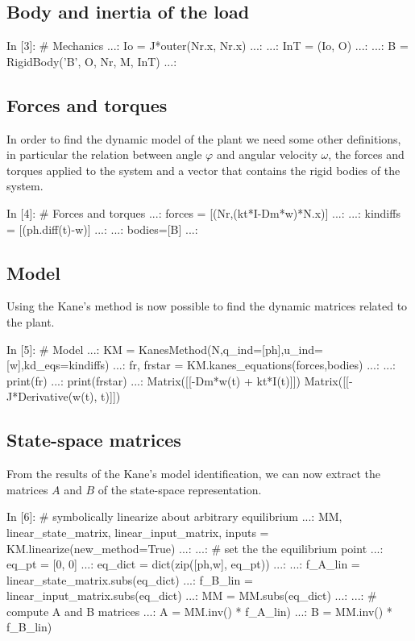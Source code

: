 \subsection{Body and inertia of the load}
\begin{code}
In [3]: # Mechanics
   ...: Io = J*outer(Nr.x, Nr.x)
   ...: 
   ...: InT = (Io, O)
   ...: 
   ...: B = RigidBody('B', O, Nr, M, InT)
   ...: 
\end{code}

\subsection{Forces and torques}
In order to find the dynamic model of the plant we need some other definitions, 
in particular the relation between angle $\varphi$ and angular velocity 
$\omega$, the forces and torques applied to the system and a vector that 
contains the rigid bodies of the system.

\begin{code}
In [4]: # Forces and torques
   ...: forces = [(Nr,(kt*I-Dm*w)*N.x)]
   ...: 
   ...: kindiffs = [(ph.diff(t)-w)]
   ...: 
   ...: bodies=[B]
   ...: 
\end{code}

\subsection{Model}

Using the Kane's method is now possible to find the dynamic matrices related to 
the plant.

\begin{code}
In [5]: # Model
   ...: KM = KanesMethod(N,q_ind=[ph],u_ind=[w],kd_eqs=kindiffs)
   ...: fr, frstar = KM.kanes_equations(forces,bodies)
   ...: 
   ...: print(fr)
   ...: print(frstar)
   ...: 
Matrix([[-Dm*w(t) + kt*I(t)]])
Matrix([[-J*Derivative(w(t), t)]])
\end{code}

\subsection{State-space matrices}
From the results of the Kane's model identification, we can now extract the 
matrices $A$ and $B$ of the state-space representation.

\begin{code}
In [6]: # symbolically linearize about arbitrary equilibrium
   ...: MM, linear_state_matrix, linear_input_matrix, inputs = 
KM.linearize(new_method=True)
   ...: 
   ...: # set the the equilibrium point
   ...: eq_pt = [0, 0]
   ...: eq_dict = dict(zip([ph,w], eq_pt))
   ...: 
   ...: f_A_lin = linear_state_matrix.subs(eq_dict)
   ...: f_B_lin = linear_input_matrix.subs(eq_dict)
   ...: MM = MM.subs(eq_dict)
   ...: 
   ...: # compute A and B matrices
   ...: A = MM.inv() * f_A_lin)
   ...: B = MM.inv() * f_B_lin)
\end{code}

